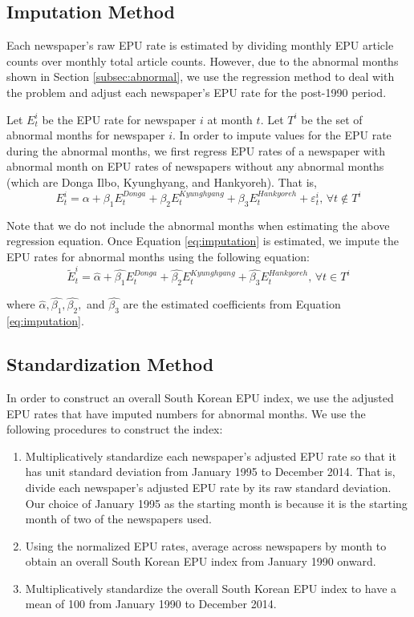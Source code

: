 \subsection{Imputation Method}

Each newspaper's raw EPU rate is estimated by dividing monthly EPU article counts over monthly total article counts. However, due to the abnormal months shown in Section \ref{subsec:abnormal}, we use the regression method to deal with the problem and adjust each newspaper's EPU rate for the post-1990 period. 

Let $E^i_t$ be the EPU rate for newspaper $i$ at month $t$. Let $T^{i}$ be the set of abnormal months for newspaper $i$. In order to impute values for the EPU rate during the abnormal months, we first regress EPU rates of a newspaper with abnormal month on EPU rates of newspapers without any abnormal months (which are Donga Ilbo, Kyunghyang, and Hankyoreh). That is,
\begin{equation} \label{eq:imputation}
E^i_t = \alpha + \beta_1 E^{Donga}_t + \beta_2 E^{Kyunghyang}_t + \beta_3 E^{Hankyoreh}_t + \varepsilon^i_t \text{, } \forall t \notin T^i
\end{equation} 

Note that we do not include the abnormal months when estimating the above regression equation. Once Equation \ref{eq:imputation} is estimated, we impute the EPU rates for abnormal months using the following equation:
\begin{equation}
\tilde{E}^i_t = \hat{\alpha} + \hat{\beta_1} E^{Donga}_t + \hat{\beta_2} E^{Kyunghyang}_t + \hat{\beta_3} E^{Hankyoreh}_t \text{, } \forall t \in T^i
\end{equation}

\noindent where $\hat{\alpha}, \hat{\beta_1}, \hat{\beta_2},$ and $\hat{\beta_3}$ are the estimated coefficients from Equation \ref{eq:imputation}. 

\subsection{Standardization Method}

In order to construct an overall South Korean EPU index, we use the adjusted EPU rates that have imputed numbers for abnormal months. We use the following procedures to construct the index:
\begin{enumerate}
\item Multiplicatively standardize each newspaper's adjusted EPU rate so that it has unit standard deviation from January 1995 to December 2014. That is, divide each newspaper's adjusted EPU rate by its raw standard deviation. Our choice of January 1995 as the starting month is because it is the starting month of two of the newspapers used. 
\item Using the normalized EPU rates, average across newspapers by month to obtain an overall South Korean EPU index from January 1990  onward. 
\item Multiplicatively standardize the overall South Korean EPU index to have a mean of 100 from January 1990  to December 2014.
\end{enumerate}


